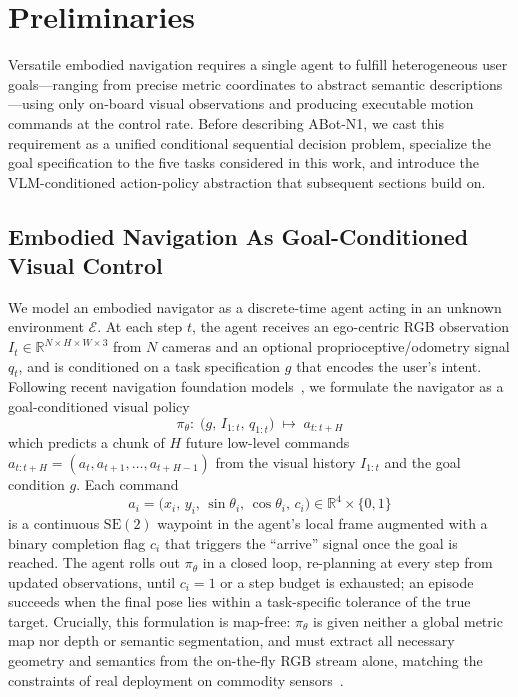 \section{Preliminaries}
\label{sec:preliminaries}

Versatile embodied navigation requires a single agent to fulfill
heterogeneous user goals---ranging from precise metric coordinates to
abstract semantic descriptions---using only on-board visual observations
and producing executable motion commands at the control rate. Before
describing ABot-N1, we cast this requirement as a unified
conditional sequential decision problem, specialize the goal
specification to the five tasks considered in this work, and introduce
the VLM-conditioned action-policy abstraction that subsequent sections
build on.

\subsection{Embodied Navigation As Goal-Conditioned Visual Control}
\label{sec:prelim-formulation}

We model an embodied navigator as a discrete-time agent acting in an
unknown environment $\mathcal{E}$. At each step $t$, the agent receives
an ego-centric RGB observation
$I_t \in \mathbb{R}^{N\times H\times W\times 3}$ from $N$ cameras and an
optional proprioceptive/odometry signal $q_t$, and is conditioned on a
task specification $g$ that encodes the user's intent. Following recent
navigation foundation
models~\cite{zhang2025navfom,zhang2024uninavid,physicalintelligence2024pi05},
we formulate the navigator as a goal-conditioned visual policy
\begin{equation}
\pi_\theta:\;\bigl(g,\,I_{1:t},\,q_{1:t}\bigr)\;\longmapsto\; a_{t:t+H}
\label{eq:nav-policy}
\end{equation}
which predicts a chunk of $H$ future low-level commands
$a_{t:t+H}=(a_t,a_{t+1},\ldots,a_{t+H-1})$ from the visual history
$I_{1:t}$ and the goal condition $g$. Each command
\begin{equation}
a_i=\bigl(x_i,\,y_i,\,\sin\theta_i,\,\cos\theta_i,\,c_i\bigr)\in\mathbb{R}^4\times\{0,1\}
\label{eq:waypoint}
\end{equation}
is a continuous $\mathrm{SE}(2)$ waypoint in the agent's local frame
augmented with a binary completion flag $c_i$ that triggers the
``arrive'' signal once the goal is reached. The agent rolls out
$\pi_\theta$ in a closed loop, re-planning at every step from updated
observations, until $c_i=1$ or a step budget is exhausted; an episode
succeeds when the final pose lies within a task-specific tolerance of
the true target. Crucially, this formulation is map-free: $\pi_\theta$
is given neither a global metric map nor depth or semantic
segmentation, and must extract all necessary geometry and semantics
from the on-the-fly RGB stream alone, matching the constraints of
real deployment on commodity
sensors~\cite{zhang2024navid,zhang2024uninavid}.

